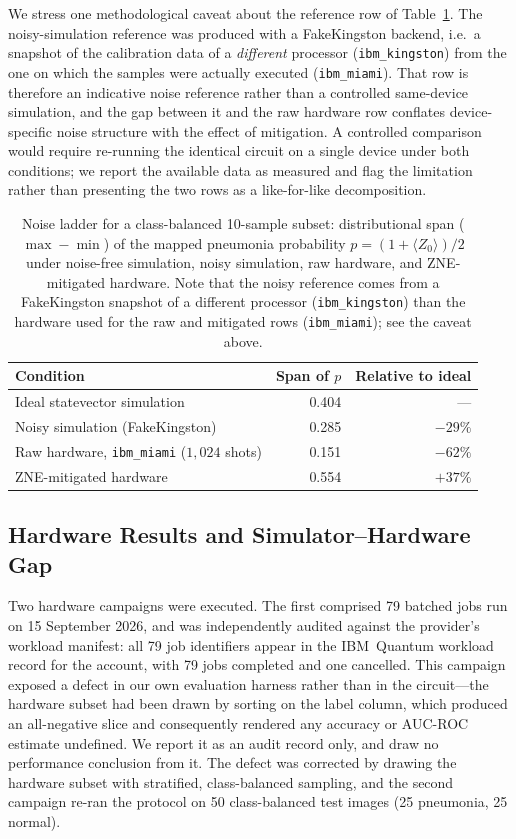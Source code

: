 \documentclass[11pt,a4paper]{article}
\begin{document}
We stress one methodological caveat about the reference row of
Table~\ref{tab:ladder}.  The noisy-simulation reference was produced with a
FakeKingston backend, i.e.\ a snapshot of the calibration data of a
\emph{different} processor (\texttt{ibm\_kingston}) from the one on which the
samples were actually executed (\texttt{ibm\_miami}).  That row is therefore an
indicative noise reference rather than a controlled same-device simulation, and
the gap between it and the raw hardware row conflates device-specific noise
structure with the effect of mitigation.  A controlled comparison would require
re-running the identical circuit on a single device under both conditions; we
report the available data as measured and flag the limitation rather than
presenting the two rows as a like-for-like decomposition.

\begin{table}[htbp]
\centering
\caption{Noise ladder for a class-balanced 10-sample subset: distributional
  span ($\max - \min$) of the mapped pneumonia probability
  $p = (1 + \langle Z_0\rangle)/2$ under noise-free simulation, noisy
  simulation, raw hardware, and ZNE-mitigated hardware.  Note that the noisy
  reference comes from a FakeKingston snapshot of a different processor
  (\texttt{ibm\_kingston}) than the hardware used for the raw and mitigated
  rows (\texttt{ibm\_miami}); see the caveat above.}
\label{tab:ladder}
\begin{tabular}{@{}lrr@{}}
\toprule
Condition & Span of $p$ & Relative to ideal \\
\midrule
Ideal statevector simulation & 0.404 & --- \\
Noisy simulation (FakeKingston) & 0.285 & $-29\%$ \\
Raw hardware, \texttt{ibm\_miami} ($1{,}024$ shots) & 0.151 & $-62\%$ \\
ZNE-mitigated hardware & 0.554 & $+37\%$ \\
\bottomrule
\end{tabular}
\end{table}

\subsection{Hardware Results and Simulator--Hardware Gap}
\label{sec:hw_results}

Two hardware campaigns were executed.  The first comprised 79 batched jobs run
on 15 September 2026, and was independently audited against the provider's
workload manifest: all 79 job identifiers appear in the IBM~Quantum workload
record for the account, with 79 jobs completed and one cancelled.  This campaign
exposed a defect in our own evaluation harness rather than in the circuit---the
hardware subset had been drawn by sorting on the label column, which produced
an all-negative slice and consequently rendered any accuracy or AUC-ROC
estimate undefined.  We report it as an audit record only, and draw no
performance conclusion from it.  The defect was corrected by drawing the
hardware subset with stratified, class-balanced sampling, and the second
campaign re-ran the protocol on 50 class-balanced test images (25 pneumonia,
25 normal).
\end{document}
